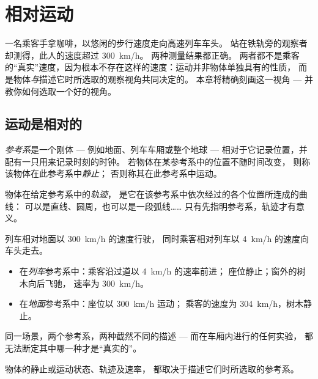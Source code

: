\chapter{相对运动}\label{ch:g10:relative-motion}

一名乘客手拿咖啡，以悠闲的步行速度走向高速列车车头。
站在铁轨旁的观察者却测得，此人的速度超过 \qty{300}{km/h}。
两种测量结果都正确。
两者都不是乘客的“真实”速度，因为根本不存在这样的速度：运动并非物体单独具有的性质，
而是物体\emph{与}描述它时所选取的观察视角共同决定的。
本章将精确刻画这一视角 ---
并教你如何选取一个好的视角。

\section{运动是相对的}

\begin{definition}[参考系]\label{def:g10:relative-motion:frame}
\emph{参考系}是一个刚体 --- 例如地面、列车车厢或整个地球 ---
相对于它记录位置，并配有一只用来记录时刻的时钟。
若物体在某参考系中的位置不随时间改变，
则称该物体在此参考系中\emph{静止}；
否则称其在此参考系中运动。
\end{definition}

\begin{definition}[轨迹]\label{def:g10:relative-motion:trajectory}
物体在给定参考系中的\emph{轨迹}，
是它在该参考系中依次经过的各个位置所连成的曲线：
可以是直线、圆周，也可以是一段弧线……
只有先指明参考系，轨迹才有意义。
\end{definition}

\begin{example}[列车上的乘客]\label{ex:g10:relative-motion:walker}
列车相对地面以 \qty{300}{km/h} 的速度行驶，
同时乘客相对列车以 \qty{4}{km/h} 的速度向车头走去。
\begin{itemize}
  \item 在\emph{列车}参考系中：乘客沿过道以 \qty{4}{km/h} 的速率前进；
        座位静止；窗外的树木向后飞驰，
        速率为 \qty{300}{km/h}。
  \item 在\emph{地面}参考系中：座位以 \qty{300}{km/h} 运动；
        乘客的速度为 \qty{304}{km/h}，树木静止。
\end{itemize}
同一场景，两个参考系，两种截然不同的描述 ---
而在车厢内进行的任何实验，
都无法断定其中哪一种才是“真实的”。
\end{example}

\begin{proposition}[运动的相对性]\label{prop:g10:relative-motion:relativity}
物体的静止或运动状态、轨迹及速率，
都取决于描述它们时所选取的参考系。
\end{proposition}

